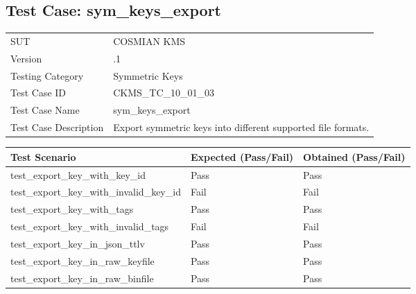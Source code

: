 \documentclass[a4paper,12pt]{article}
\begin{document}
    \newpage
    
\subsection{Test Case: sym\_keys\_export}

\begin{table}[h]
    \centering
    \begin{tabularx}{1\textwidth}{ 
      | >{\raggedright\arraybackslash}X 
      | >{\raggedright\arraybackslash}X | }
        \hline
        \rowcolor{grey!15}
        \multicolumn{2}{|c|}{\textbf{Software Information}} \\  %
        \hline
        SUT & COSMIAN KMS \\
        \hline
        Version & 4.19.1 \\
        \hline
        Testing Category & Symmetric Keys \\
        \hline
        Test Case ID & CKMS\_TC\_10\_01\_03 \\
        \hline
        Test Case Name & sym\_keys\_export \\
        \hline
        Test Case Description & Export symmetric keys into different supported file formats. \\
        \hline
    \end{tabularx}
\end{table}

\begin{table}[h]
    \centering
    \begin{tabularx}{1\textwidth}{ 
      | >{\raggedright\arraybackslash}X   
      | p{2.5cm}                            
      | p{2.5cm} |}                         
        \hline
        \textbf{Test Scenario} & \textbf{Expected (Pass/Fail)} & \textbf{Obtained (Pass/Fail)} \\  
        \hline

test\_export\_key\_with\_key\_id & Pass & Pass \\
\hline

test\_export\_key\_with\_invalid\_key\_id & Fail & Fail \\
\hline

test\_export\_key\_with\_tags & Pass & Pass \\
\hline

test\_export\_key\_with\_invalid\_tags & Fail & Fail \\
\hline

test\_export\_key\_in\_json\_ttlv & Pass & Pass \\
\hline

test\_export\_key\_in\_raw\_keyfile & Pass & Pass \\
\hline

test\_export\_key\_in\_raw\_binfile & Pass & Pass \\
\hline

    \end{tabularx}
\end{table}
\end{document}
